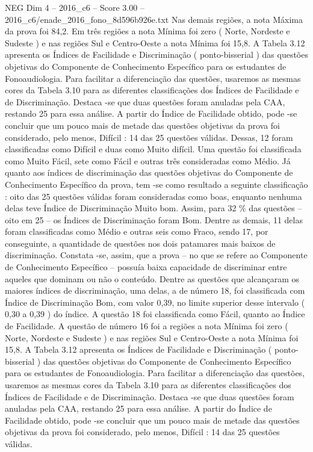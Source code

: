 \begin{textsample}{NEG Dim 4 – 2016\_c6 – Score 3.00 – 2016\_c6/enade\_2016\_fono\_8d596b926e.txt}
Nas demais regiões, a nota Máxima da prova foi 84,2.
Em três regiões a nota Mínima foi zero ( Norte, Nordeste e Sudeste ) e nas regiões Sul e Centro-Oeste a nota Mínima foi 15,8.
A Tabela 3.12 apresenta os Índices de Facilidade e Discriminação ( ponto-bisserial ) das questões objetivas do Componente de Conhecimento Específico para os estudantes de Fonoaudiologia.
Para facilitar a diferenciação das questões, usaremos as mesmas cores da Tabela 3.10 para as diferentes classificações dos Índices de Facilidade e de Discriminação.
Destaca -se que duas questões foram anuladas pela CAA, restando 25 para essa análise.
A partir do Índice de Facilidade obtido, pode -se concluir que um pouco mais de metade das questões objetivas da prova foi considerado, pelo menos, Difícil : 14 das 25 questões válidas.
Dessas, 12 foram classificadas como Difícil e duas como Muito difícil.
Uma questão foi classificada como Muito Fácil, sete como Fácil e outras três consideradas como Médio.
Já quanto aos índices de discriminação das questões objetivas do Componente de Conhecimento Específico da prova, tem -se como resultado a seguinte classificação : oito das 25 questões válidas foram consideradas como boas, enquanto nenhuma delas teve Índice de Discriminação Muito bom.
Assim, para 32 \% das questões – oito em 25 – os Índices de Discriminação foram Bom.
Dentre as demais, 11 delas foram classificadas como Médio e outras seis como Fraco, sendo 17, por conseguinte, a quantidade de questões nos dois patamares mais baixos de discriminação.
Constata -se, assim, que a prova – no que se refere ao Componente de Conhecimento Específico – possuía baixa capacidade de discriminar entre aqueles que dominam ou não o conteúdo.
Dentre as questões que alcançaram os maiores índices de discriminação, uma delas, a de número 18, foi classificada com Índice de Discriminação Bom, com valor 0,39, no limite superior desse intervalo ( 0,30 a 0,39 ) do índice.
A questão 18 foi classificada como Fácil, quanto ao Índice de Facilidade.
A questão de número 16 foi a regiões a nota Mínima foi zero ( Norte, Nordeste e Sudeste ) e nas regiões Sul e Centro-Oeste a nota Mínima foi 15,8.
A Tabela 3.12 apresenta os Índices de Facilidade e Discriminação ( ponto-bisserial ) das questões objetivas do Componente de Conhecimento Específico para os estudantes de Fonoaudiologia.
Para facilitar a diferenciação das questões, usaremos as mesmas cores da Tabela 3.10 para as diferentes classificações dos Índices de Facilidade e de Discriminação.
Destaca -se que duas questões foram anuladas pela CAA, restando 25 para essa análise.
A partir do Índice de Facilidade obtido, pode -se concluir que um pouco mais de metade das questões objetivas da prova foi considerado, pelo menos, Difícil : 14 das 25 questões válidas.

\end{textsample}
